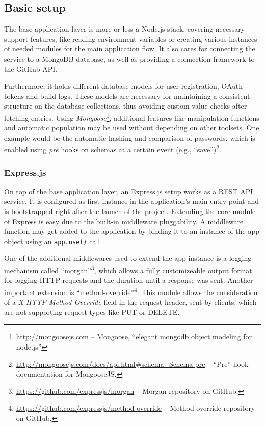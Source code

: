 \subsection{Basic setup}
The base application layer is more or less a Node.js stack, covering necessary support features, like reading environment variables or creating various instances of needed modules for the main application flow. It also cares for connecting the service to a MongoDB database, as well as providing a connection framework to the GitHub API.

Furthermore, it holds different database models for user registration, OAuth tokens and build logs. These models are necessary for maintaining a consistent structure on the database collections, thus avoiding custom value checks after fetching entries. Using \emph{Mongoose}\footnote{\url{http://mongoosejs.com} -- Mongoose, ``elegant mongodb object modeling for node.js''}, additional features like manipulation functions and automatic population may be used without depending on other toolsets. One example would be the automatic hashing and comparison of passwords, which is enabled using \emph{pre} hooks on schemas at a certain event (e.g., ``save'')\footnote{\url{http://mongoosejs.com/docs/api.html\#schema_Schema-pre} -- ``Pre'' hook documentation for MongooseJS.}.

\subsubsection{Express.js}
On top of the base application layer, an Express.js setup works as a REST API service. It is configured as first instance in the application's main entry point and is bootstrapped right after the launch of the project. Extending the core module of Express is easy due to the built-in middleware pluggability. A middleware function may get added to the application by binding it to an instance of the app object using an \texttt{app.use()} call \cite{ExpressMiddleware}.

One of the additional middlewares used to extend the app instance is a logging mechanism called ``morgan''\footnote{\url{https://github.com/expressjs/morgan} -- Morgan repository on GitHub.}, which allows a fully customizeable output format for logging HTTP requests and the duration until a response was sent. Another important extension is ``method-override''\footnote{\url{https://github.com/expressjs/method-override} -- Method-override repository on GitHub.}. This module allows the consideration of a \emph{X-HTTP-Method-Override} field in the request header, sent by clients, which are not supporting request types like PUT or DELETE.

